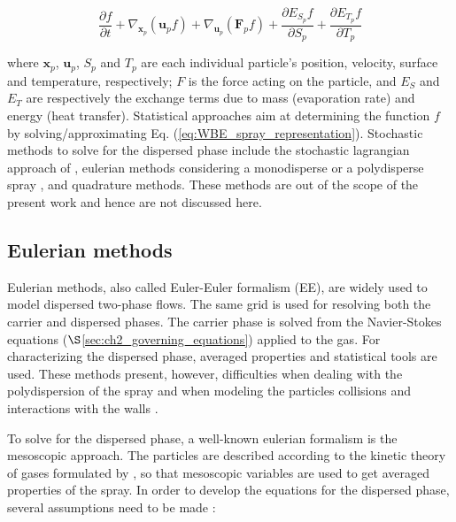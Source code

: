 \begin{equation}
\label{eq:WBE_spray_representation}
\frac{\partial f}{\partial t} + \nabla_{\textbf{x}_p} \left( \textbf{u}_p f \right) + \nabla_{\textbf{u}_p} \left( \textbf{F}_p f \right) + \frac{\partial E_{S_p} f}{\partial S_p} + \frac{\partial E_{T_p} f}{\partial T_p}
\end{equation}

where $\textbf{x}_p$, $\textbf{u}_p$, $S_p$ and $T_p$ are each individual particle's position, velocity, surface and temperature, respectively; $F$ is the force acting on the particle, and $E_S$ and $E_T$ are respectively the exchange terms due to mass (evaporation rate) and energy (heat transfer). Statistical approaches aim at determining the function $f$ by solving/approximating Eq. (\ref{eq:WBE_spray_representation}). Stochastic methods to solve for the dispersed phase include the stochastic lagrangian approach of , eulerian methods considering a monodisperse  or a polydisperse spray , and quadrature methods. These methods are out of the scope of the present work and hence are not discussed here.



\subsection{Eulerian methods}

Eulerian methods, also called Euler-Euler formalism (EE), are widely used to model dispersed two-phase flows. The same grid is used for resolving both the carrier and dispersed phases. The carrier phase is solved from the Navier-Stokes equations ($\S$\ref{sec:ch2_governing_equations}) applied to the gas. For characterizing the dispersed phase, averaged properties and statistical tools are used. These methods present, however, difficulties when dealing with the polydispersion of the spray and when modeling the particles collisions and interactions with the walls .

To solve for the dispersed phase, a well-known eulerian formalism is the mesoscopic approach. The particles are described according to the kinetic theory of gases formulated by , so that mesoscopic variables are used to get averaged properties of the spray. In order to develop the equations for the dispersed phase, several assumptions need to be made :


